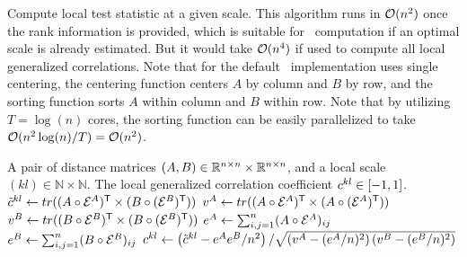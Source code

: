 \documentclass[11pt]{extarticle}
\begin{document}
\clearpage

\begin{algorithm}
\caption{Compute local test statistic at a given scale. This algorithm runs in $\mathcal{O}(n^2)$ once the rank information is provided, which is suitable for \Mgc~computation if an optimal scale is already estimated. But it would take $\mathcal{O}(n^4)$ if used to compute all local generalized correlations. Note that for the default \Mgc~implementation uses single centering, the centering function centers $A$ by column and $B$ by row, and the sorting function sorts $A$ within column and $B$ within row. Note that by utilizing $T=\log(n)$ cores, the sorting function can be easily parallelized to take $\mathcal{O}(n^2 \log(n)/T)=\mathcal{O}(n^2)$.}
\label{alg:1scale}
\begin{algorithmic}[1]
\Require A pair of distance matrices $(A, B) \in \mathbb{R}^{n \times n} \times \mathbb{R}^{n \times n}$, and a  local scale $(kl) \in \mathbb{N} \times \mathbb{N}$.
\Ensure The local generalized correlation coefficient $c^{kl} \in [-1,1]$.
 
  
\State $\tilde{c}^{kl} \leftarrow tr((A \circ \mathcal{E}^{A})^{\mathsf{T}} \times (B \circ (\mathcal{E}^{B})^{\mathsf{T}}))$ 
\State $v^{A} \leftarrow tr((A \circ \mathcal{E}^{A})^{\mathsf{T}} \times (A \circ (\mathcal{E}^{A})^{\mathsf{T}}))$ 
\State $v^{B} \leftarrow tr((B \circ \mathcal{E}^{B})^{\mathsf{T}} \times (B \circ (\mathcal{E}^{B})^{\mathsf{T}}))$
\State $e^{A} \leftarrow \sum_{i,j=1}^{n}(A \circ \mathcal{E}^{A})_{ij}$ 
\State $e^{B} \leftarrow \sum_{i,j=1}^{n}(B \circ \mathcal{E}^{B})_{ij}$
\State $c^{kl} \leftarrow \left(\tilde{c}^{kl}-e^{A}e^{B}/n^2\right)/\sqrt{\left(v^{A}-(e^{A}/n)^2 \right) \left(v^{B}-(e^{B}/n)^2\right)}$ 

\EndFunction
\end{algorithmic}
\end{algorithm}

\clearpage
\end{document}
